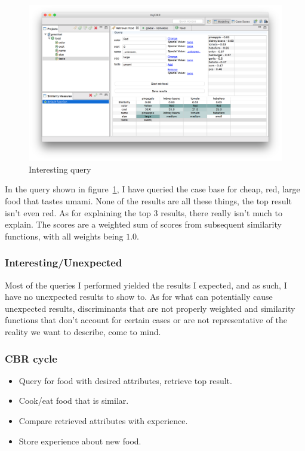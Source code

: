\documentclass[paper=a4, fontsize=11pt]{scrartcl} %
\numberwithin{equation}{section} %
\numberwithin{figure}{section} %
\numberwithin{table}{section} %
\begin{document}
\begin{figure}[h]
    \centering
    \includegraphics[width=\linewidth]{img/interesting.png}
    \caption{Interesting query} \label{fig:interesting}
\end{figure}

In the query shown in figure~\ref{fig:interesting}, I have queried the case base for cheap, red, large food that tastes umami.
None of the results are all these things, the top result isn't even red.
As for explaining the top 3 results, there really isn't much to explain.
The scores are a weighted sum of scores from subsequent similarity functions, with all weights being $1.0$.


\subsubsection{Interesting/Unexpected}

Most of the queries I performed yielded the results I expected, and as such, I have no unexpected results to show to.
As for what can potentially cause unexpected results, discriminants that are not properly weighted and similarity functions that don't account for certain cases or are not representative of the reality we want to describe, come to mind.

\subsubsection{CBR cycle}

\begin{itemize}
        \item Query for food with desired attributes, retrieve top result.
        \item Cook/eat food that is similar.
        \item Compare retrieved attributes with experience.
        \item Store experience about new food.
\end{itemize}
\end{document}
